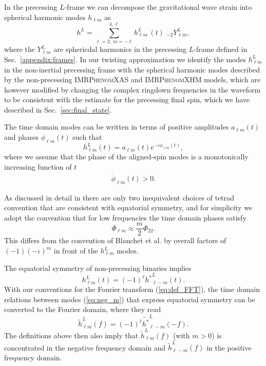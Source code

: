\documentclass[%
aps,
prd,
amssymb,
amsmath,
amsfonts,
eqsecnum,
showpacs,
nofootinbib,
floatfix,
twocolumn,
twoside,
a4paper,
superscriptaddress
]{revtex4-1}
\newcommand{\phX}{\textsc{IMRPhenomXAS}\xspace}
\newcommand{\phXHM}{\textsc{IMRPhenomXHM}\xspace}
\begin{document}
In the precessing $L$-frame we can decompose the gravitational wave strain into spherical harmonic modes $h_{\ell m}$ as
\begin{equation}\label{eq:h_harmonics}
    h^L = \sum_{\ell=2, \, m=-\ell}^{4,\ell}   h_{\ell m}^L \, (t) \; _{-2}Y_{\ell m}^L,
\end{equation}
where the $Y_{\ell m}^L$ are sphericdal harmonics in the precessing $L$-frame defined in Sec.~\ref{appendix:frames}. In our twisting approximation we identify the modes $h_{\ell m}^L$ in the non-inertial precessing frame with the spherical harmonic modes described by the non-precessing \phX and \phXHM models, which are however modified by changing the complex ringdown frequencies in the waveform to be consistent with the estimate for the precessing final spin, which we have described in Sec.~\ref{sec:final_state}.

The time domain modes can be written in terms of positive amplitudes $a_{\ell m} (t)$ and phases $\phi_{\ell m} (t)$ such that 
\begin{equation}
h_{\ell m}^L (t) = a_{\ell m} (t) e^{- i \phi_{\ell m} (t)},
\end{equation}
where we assume that the phase of the aligned-spin modes is a monotonically increasing function of $t$ 
\begin{align}
    \dot{\phi}_{\ell m} (t) > 0.
\end{align}

As discussed in detail in \cite{Garcia-Quiros:2020qpx} there are only two inequivalent choices of tetrad convention that are consistent with equatorial symmetry, and for simplicity we adopt the convention that for low frequencies the time domain phases satisfy
\begin{equation}\label{eq:tetrad_convention}
    \Phi_{\ell m} \approx  \frac{m}{2}\Phi_{2 2} .
\end{equation}
%
This differs from the convention of Blanchet et al. \cite{Blanchet:2008je} by overall factors of $(-1) (-\iota)^m$ in front of the $h_{\ell m}^L$ modes.

The equatorial symmetry of non-precessing binaries implies
\begin{equation}\label{eq:neg_m}
    h_{\ell m}^L(t) = (-1)^\ell {h^{*}}_{\ell -m}^L(t). 
\end{equation}
%
With our conventions  for the Fourier transform (\ref{eq:def_FFT}),
the time domain relations between modes (\ref{eq:neg_m}) that express equatorial symmetry can be converted to the Fourier domain, where they read 
\begin{equation}\label{eq:htilde_mode_relations}
   \tilde h_{\ell m}^L(f) =  (-1)^\ell \tilde {h^{*}}_{\ell -m}^L(-f).
\end{equation}
The definitions above then also imply that $\tilde h_{\ell m}^L(f)$ (with $m>0$) is concentrated
in the negative frequency domain and $\tilde h_{\ell -m}^L(f)$ 
in the positive frequency domain. 
\end{document}
